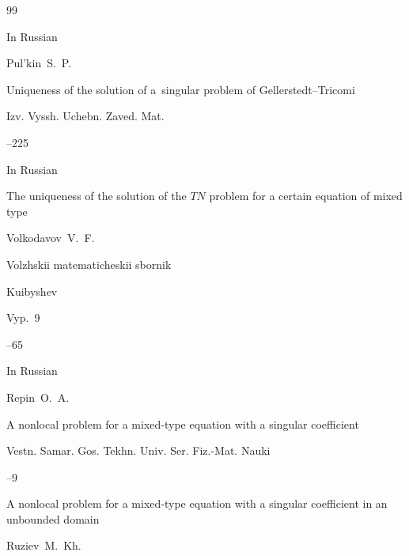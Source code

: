 \begin{thebibliography}{99}




\lang In Russian

\by Pul'kin~S.~P.

\paper Uniqueness of the solution of a~singular problem of Gellerstedt--Tricomi

\jour Izv. Vyssh. Uchebn. Zaved. Mat.



--225






\lang In Russian

\paper The uniqueness of the solution of the $TN$ problem for a certain equation of mixed type

\by Volkodavov~V.~F.

\inbook Volzhskii matematicheskii sbornik

\publaddr Kuibyshev

\volinfo Vyp.~9


--65








\lang In Russian

\by Repin~O.~A.

\paper A nonlocal problem for a mixed-type equation with a singular coefficient

\jour  Vestn. Samar. Gos. Tekhn. Univ. Ser. Fiz.-Mat. Nauki



--9







\paper A nonlocal problem for a mixed-type equation with a singular coefficient in an unbounded domain

\by Ruziev~M.~Kh.



\end{thebibliography}
